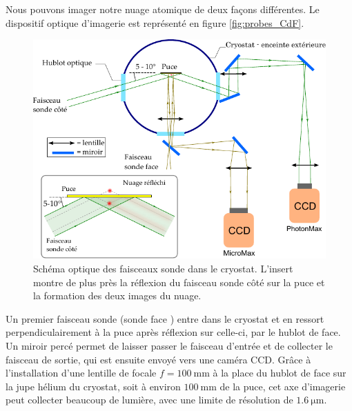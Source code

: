 Nous pouvons imager notre nuage atomique de deux façons différentes.
Le dispositif optique d'imagerie est représenté en figure \eqref{fig:probes_CdF}.
%
\begin{figure}[!h]
\centering
\includegraphics[width=.7\linewidth]{figures/setup/coldatoms/probes_CdF}
\caption[Faisceaux sonde]{Schéma optique des faisceaux sonde dans le cryostat.
L'insert montre de plus près la réflexion du faisceau sonde côté sur la puce et la formation des deux images du nuage.
}
\label{fig:probes_CdF}
\end{figure}
%
Un premier faisceau sonde (\og sonde face \fg{})  entre dans le cryostat et en ressort perpendiculairement à la puce après réflexion sur celle-ci, par le hublot de face.
Un miroir percé permet de laisser passer le faisceau d'entrée et de collecter le faisceau de sortie, qui est ensuite envoyé vers une caméra CCD.
Grâce à l'installation d'une lentille de focale $f=\SI{100}{\mm}$ à la place du hublot de face sur la jupe hélium du cryostat, soit à environ $\SI{100}{\mm}$ de la puce, cet axe d'imagerie peut collecter beaucoup de lumière, avec une limite de résolution de $\SI{1.6}{\um}$.

